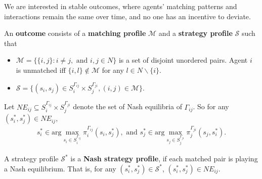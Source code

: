 \documentclass{myPaper}
\begin{document}
We are interested in stable outcomes, where agents’ matching patterns and interactions remain the same over time, and no one has an incentive to deviate.

\begin{definition} \label{def:outcomet}
An \textbf{outcome} consists of a \textbf{matching profile} $\mathcal{M}$ and a \textbf{strategy profile} $\mathcal{S}$ such that
\begin{itemize}
    \item $\mathcal{M} =\{\{i, j\}: i \ne j, \text{ and } i, j \in N\}$ is a set of disjoint unordered pairs. Agent $i$ is unmatched iff $\{i, l\} \notin \mathcal{M}$ for any $l \in N \backslash \{i \}$.
    \item $\mathcal{S}=\{(s_i, s_j) \in S_i^{\Gamma_{ij}} \times S_j^{\Gamma_{ji}}, (i, j) \in \mathcal{M}\}$.
\end{itemize}
\end{definition}

\noindent Let $NE_{ij} \subseteq S_i^{\Gamma_{ij}} \times S_j^{\Gamma_{ji}}$ denote the set of Nash equilibria of $\Gamma_{ij}$. So for any $(s_i^*, s_j^*) \in NE_{ij}$,
\begin{eqnarray}
s_i^* \in \text{arg}\max_{s_i \in S_i^{\Gamma_{ij}}}\pi_i^{\Gamma_{ij}}(s_i, s_j^*), \text{ and } s_j^* \in \text{arg}\max_{s_j \in S_j^{\Gamma_{ji}}}\pi_j^{\Gamma_{ji}}(s_j, s_i^*). \nonumber
\end{eqnarray}

\begin{definition} \label{def:Nash}
A strategy profile $\mathcal{S}^*$ is a \textbf{Nash strategy profile}, if each matched pair is playing a Nash equilibrium. That is, for any $(s_i^*, s_j^*) \in \mathcal{S}^*$, $(s_i^*, s_j^*) \in NE_{ij}$.

\end{definition}
\end{document}

